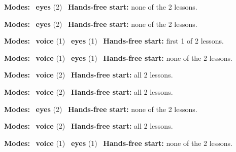 \expandafter\def\csname hlchaptermodality6\endcsname{%
  {\small\noindent
    \textbf{Modes:} \hlsightsign{}~\textbf{eyes} (2)\quad
    \hlvoicesign{}~\textbf{Hands-free start:} none of the 2 lessons.%
    \par}\medskip
}

\expandafter\def\csname hlchaptermodality7\endcsname{%
  {\small\noindent
    \textbf{Modes:} \hlsightsign{}~\textbf{eyes} (2)\quad
    \hlvoicesign{}~\textbf{Hands-free start:} none of the 2 lessons.%
    \par}\medskip
}

\expandafter\def\csname hlchaptermodality8\endcsname{%
  {\small\noindent
    \textbf{Modes:} \hlvoicesign{}~\textbf{voice} (1) \quad \hlsightsign{}~\textbf{eyes} (1)\quad
    \hlvoicesign{}~\textbf{Hands-free start:} first 1 of 2 lessons.%
    \par}\medskip
}

\expandafter\def\csname hlchaptermodality9\endcsname{%
  {\small\noindent
    \textbf{Modes:} \hlvoicesign{}~\textbf{voice} (1) \quad \hlsightsign{}~\textbf{eyes} (1)\quad
    \hlvoicesign{}~\textbf{Hands-free start:} none of the 2 lessons.%
    \par}\medskip
}

\expandafter\def\csname hlchaptermodality10\endcsname{%
  {\small\noindent
    \textbf{Modes:} \hlvoicesign{}~\textbf{voice} (2)\quad
    \hlvoicesign{}~\textbf{Hands-free start:} all 2 lessons.%
    \par}\medskip
}

\expandafter\def\csname hlchaptermodality11\endcsname{%
  {\small\noindent
    \textbf{Modes:} \hlvoicesign{}~\textbf{voice} (2)\quad
    \hlvoicesign{}~\textbf{Hands-free start:} all 2 lessons.%
    \par}\medskip
}

\expandafter\def\csname hlchaptermodality12\endcsname{%
  {\small\noindent
    \textbf{Modes:} \hlsightsign{}~\textbf{eyes} (2)\quad
    \hlvoicesign{}~\textbf{Hands-free start:} none of the 2 lessons.%
    \par}\medskip
}

\expandafter\def\csname hlchaptermodality13\endcsname{%
  {\small\noindent
    \textbf{Modes:} \hlvoicesign{}~\textbf{voice} (2)\quad
    \hlvoicesign{}~\textbf{Hands-free start:} all 2 lessons.%
    \par}\medskip
}

\expandafter\def\csname hlchaptermodality14\endcsname{%
  {\small\noindent
    \textbf{Modes:} \hlvoicesign{}~\textbf{voice} (1) \quad \hlsightsign{}~\textbf{eyes} (1)\quad
    \hlvoicesign{}~\textbf{Hands-free start:} none of the 2 lessons.%
    \par}\medskip
}

